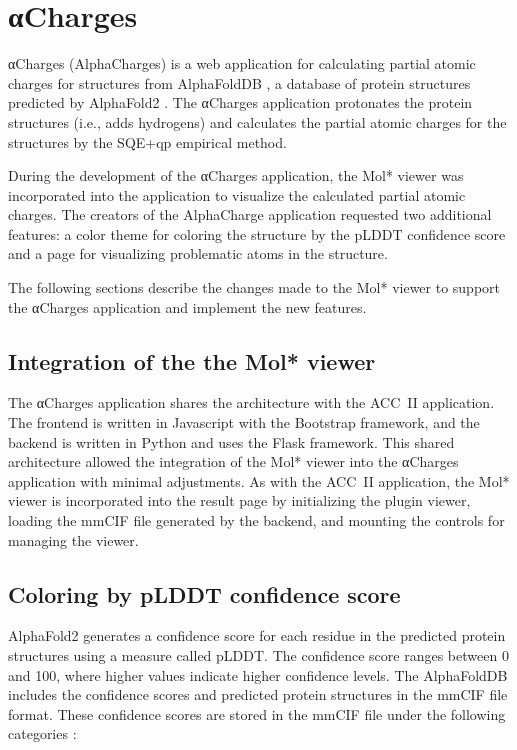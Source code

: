\documentclass[
  digital,     %
  oneside,     %
  nosansbold,  %
  nocolorbold, %
  lof,         %
  lot,         %
]{fithesis4}
\begin{document}
\clearpage
\newpage

\chapter{αCharges}
\label{chapter:alphacharges}

αCharges (AlphaCharges) is a web application for calculating partial atomic charges for structures from AlphaFoldDB \cite{varadi2021alphafold}, a database of protein structures predicted by AlphaFold2 \cite{jumper2021alphafold}. The αCharges application protonates the protein structures (i.e., adds hydrogens) and calculates the partial atomic charges for the structures by the SQE+qp \cite{schindler2021sqe} empirical method. \cite{schindler2023alphacharges}

During the development of the αCharges application, the Mol* viewer was incorporated into the application to visualize the calculated partial atomic charges. The creators of the AlphaCharge application requested two additional features: a color theme for coloring the structure by the pLDDT confidence score and a page for visualizing problematic atoms in the structure.

The following sections describe the changes made to the Mol* viewer to support the αCharges application and implement the new features.

\section{Integration of the the Mol* viewer}

The αCharges application shares the architecture with the ACC~II application. The frontend is written in Javascript with the Bootstrap framework, and the backend is written in Python and uses the Flask framework. \cite{schindler2023alphacharges} This shared architecture allowed the integration of the Mol* viewer into the αCharges application with minimal adjustments. As with the ACC~II application, the Mol* viewer is incorporated into the result page by initializing the plugin viewer, loading the mmCIF file generated by the backend, and mounting the controls for managing the viewer.

\section{Coloring by pLDDT confidence score}

AlphaFold2 generates a confidence score for each residue in the predicted protein structures using a measure called pLDDT. The confidence score ranges between 0 and 100, where higher values indicate higher confidence levels. \cite{varadi2021alphafold} The AlphaFoldDB includes the confidence scores and predicted protein structures in the mmCIF file format. These confidence scores are stored in the mmCIF file under the following categories \cite{mmcif_dictionary}:
\end{document}
